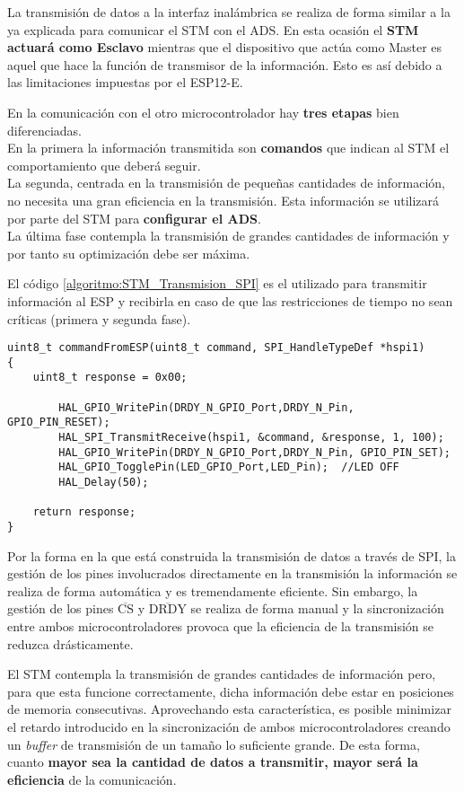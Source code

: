 La transmisión de datos a la interfaz inalámbrica se realiza de forma similar a la ya explicada para comunicar el STM con el ADS. En esta ocasión el \textbf{STM actuará como Esclavo} mientras que el dispositivo que actúa como Master es aquel que hace la función de transmisor de la información. Esto es así debido a las limitaciones impuestas por el ESP12-E. 

En la comunicación con el otro microcontrolador hay \textbf{tres etapas} bien diferenciadas.\\
En la primera la información transmitida son \textbf{comandos} que indican al STM el comportamiento que deberá seguir.\\
La segunda, centrada en la transmisión de pequeñas cantidades de información, no necesita una gran eficiencia en la transmisión. Esta información se utilizará por parte del STM para \textbf{configurar el ADS}.\\
La última fase contempla la transmisión de grandes cantidades de información y por tanto su optimización debe ser máxima.

El código \ref{algoritmo:STM_Transmision_SPI} es el utilizado para transmitir información al ESP y recibirla en caso de que las restricciones de tiempo no sean críticas (primera y segunda fase).

\begin{lstlisting}[label=algoritmo:STM_Transmision_SPI,style = STM-code,frame=single,caption=Transmisión de datos a través de SPI con el STM]
uint8_t commandFromESP(uint8_t command, SPI_HandleTypeDef *hspi1)
{
	uint8_t response = 0x00;	

		HAL_GPIO_WritePin(DRDY_N_GPIO_Port,DRDY_N_Pin, GPIO_PIN_RESET);
		HAL_SPI_TransmitReceive(hspi1, &command, &response, 1, 100);
		HAL_GPIO_WritePin(DRDY_N_GPIO_Port,DRDY_N_Pin, GPIO_PIN_SET);
		HAL_GPIO_TogglePin(LED_GPIO_Port,LED_Pin); 	//LED OFF
		HAL_Delay(50);
	
	return response;
}
\end{lstlisting}

Por la forma en la que está construida la transmisión de datos a través de SPI, la gestión de los pines involucrados directamente en la transmisión la información se realiza de forma automática y es tremendamente eficiente. Sin embargo, la gestión de los pines $\overline{\text{CS}}$ y $\overline{\text{DRDY}}$ se realiza de forma manual y la sincronización entre ambos microcontroladores provoca que la eficiencia de la transmisión se reduzca drásticamente. 

El STM contempla la transmisión de grandes cantidades de información pero, para que esta funcione correctamente, dicha información debe estar en posiciones de memoria consecutivas. Aprovechando esta característica, es posible minimizar el retardo introducido en la sincronización de ambos microcontroladores creando un \textit{buffer} de transmisión de un tamaño lo suficiente grande. De esta forma, cuanto \textbf{mayor sea la cantidad de datos a transmitir, mayor será la eficiencia} de la comunicación.

